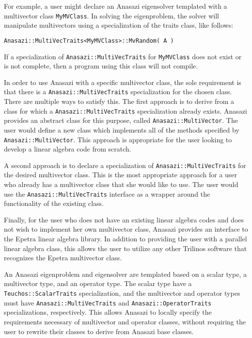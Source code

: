 For example, a user might declare an Anasazi eigensolver templated with a
multivector class \verb!MyMVClass!. In solving the eigenproblem, the solver will
manipulate multivectors using a specialization of the traits class, like
follows:
\begin{verbatim}
Anasazi::MultiVecTraits<MyMVClass>::MvRandom( A )
\end{verbatim}
If a specialization of \verb!Anasazi::MultiVecTraits! for \verb!MyMVClass! does
not exist or is not complete, then a program using this class will not compile.

In order to use Anasazi with a specific multivector class, the sole requirement
is that there is a \verb!Anasazi::MultiVecTraits! specialization for the chosen
class. There are multiple ways to satisfy this. The first approach is
to derive from a class for which a \verb!Anasazi::MultiVecTraits! specialization
already exists. Anasazi provides an abstract class for this purpose, called
\verb!Anasazi::MultiVector!. The user would define a new class which implements
all of the methods specified by \verb!Anasazi::MultiVector!. This approach is
appropriate for the user looking to develop a linear algebra code from scratch.

A second approach is to declare a specialization of
\verb!Anasazi::MultiVecTraits! for the desired multivector class. This is the
most appropriate approach for a user who already has a multivector class that
she would like to use. The user would use the \verb!Anasazi::MultiVecTraits!
interface as a wrapper around the functionality of the existing class.

Finally, for the user who does not have an existing linear algebra codes and
does not wish to implement her own multivector class, Anasazi provides an
interface to the Epetra linear algebra library. In addition to providing the
user with a parallel linear algebra class, this allows the user to utilize any
other Trilinos software that recognizes the Epetra multivector class.

\begin{remark} 
An Anasazi eigenproblem and eigensolver are templated based on a scalar type, a
multivector type, and an operator type. The scalar type have a
\verb!Teuchos::ScalarTraits! specialization, and the multivector and operator
types must have \verb!Anasazi::MultiVecTraits! and
\verb!Anasazi::OperatorTraits! specializations, respectively. This allows
Anasazi to locally specify the requirements necessary of multivector and
operator classes, without requiring the user to rewrite their classes to derive
from Anasazi base classes.
\end{remark}



